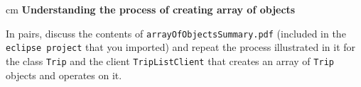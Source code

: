 \begin{questions}
%
%
%
%
%
%

 cm \question \textbf{Understanding the process of creating array of objects} \vskip 0.5cm

In pairs, discuss the contents of \texttt{arrayOfObjectsSummary.pdf} (included in the \texttt{eclipse project} that you imported) and repeat the process illustrated in it for the class \texttt{Trip} and the client \texttt{TripListClient} that creates an array of \texttt{Trip} objects and operates on it.


\end{questions}
